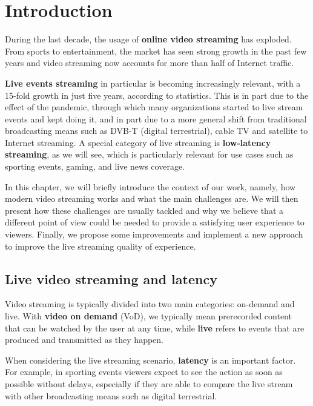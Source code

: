 
\chapter{Introduction}
\label{cha:intro}

During the last decade, the usage of \textbf{online video streaming} has exploded. From sports to entertainment, the market has seen strong growth in the past few years and video streaming now accounts for more than half of Internet traffic.\cite{cisco2019}

\textbf{Live events streaming} in particular is becoming increasingly relevant, with a 15-fold growth in just five years, according to statistics. This is in part due to the effect of the pandemic, through which many organizations started to live stream events and kept doing it, and in part due to a more general shift from traditional broadcasting means such as DVB-T (digital terrestrial), cable TV and satellite to Internet streaming. A special category of live streaming is \textbf{low-latency streaming}, as we will see, which is particularly relevant for use cases such as sporting events, gaming, and live news coverage.

In this chapter, we will briefly introduce the context of our work, namely, how modern video streaming works and what the main challenges are. We will then present how these challenges are usually tackled and why we believe that a different point of view could be needed to provide a satisfying user experience to viewers. Finally, we propose some improvements and implement a new approach to improve the live streaming quality of experience.

\section{Live video streaming and latency}
\label{sec:intro/live}

Video streaming is typically divided into two main categories: on-demand and live. With \textbf{video on demand} (VoD), we typically mean prerecorded content that can be watched by the user at any time, while \textbf{live} refers to events that are produced and transmitted as they happen.

When considering the live streaming scenario, \textbf{latency} is an important factor. For example, in sporting events viewers expect to see the action as soon as possible without delays, especially if they are able to compare the live stream with other broadcasting means such as digital terrestrial.

